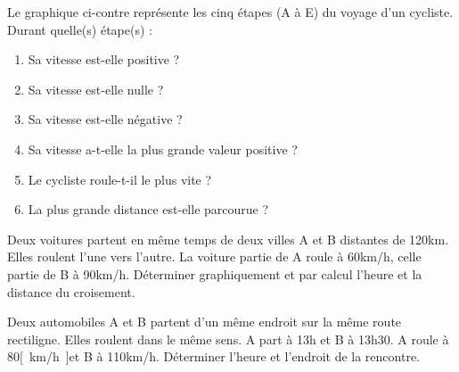 \begin{exercise}
    Le graphique ci-contre représente les cinq étapes (A à E) du voyage d'un cycliste. Durant quelle(s) étape(s) :
    \begin{enumerate}[label=\alph*)]
        \item Sa vitesse est-elle positive ?
        \item Sa vitesse est-elle nulle ?
        \item Sa vitesse est-elle négative ?
        \item Sa vitesse a-t-elle la plus grande valeur positive ?
        \item Le cycliste roule-t-il le plus vite ?
        \item La plus grande distance est-elle parcourue ?
    \end{enumerate}

\end{exercise}
\begin{solution}
\end{solution}

\begin{exercise}
\end{exercise}

\begin{exercise}
    Deux voitures partent en même temps de deux villes A et B distantes de 120km. Elles roulent l'une vers l'autre. La voiture partie de A roule à 60km/h, celle partie de B à 90km/h. Déterminer graphiquement et par calcul l'heure et la distance du croisement.
\end{exercise}
\begin{solution}
\end{solution}

\begin{exercise}
    Deux automobiles A et B partent d'un même endroit sur la même route rectiligne. Elles roulent dans le même sens. A part à 13h et B à 13h30. A roule à 80\unit{[km/h]}et B à 110km/h. Déterminer l'heure et l'endroit de la rencontre.
\end{exercise}
\begin{solution}
\end{solution}

